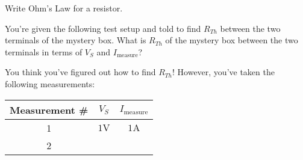 

\begin{enumerate}

\qitem\label{ohmsLaw}{
	Write Ohm's Law for a resistor.}


\qitem\label{singlePoint}{
	You're given the following test setup and told to find $R_{Th}$ between the two terminals of the mystery box. What is $R_{Th}$ of the mystery box between the two terminals in terms of $V_S$ and $I_\text{measure}$?
	\begin{center}
		
	\end{center}}


\qitem\label{twoNoisyMeasurements}{
	You think you've figured out how to find $R_{Th}$! However, you've taken the following measurements:
	\begin{center}
		\begin{tabular}{|c|c|c|}
			\hline
			Measurement \# & $V_S$ & $I_\text{measure}$\\\hline
			1 & $1\si{\volt}$ & $1\si{\ampere}$\\\hline
			2 & 
		\end{tabular}
	\end{center}
}

\end{enumerate}